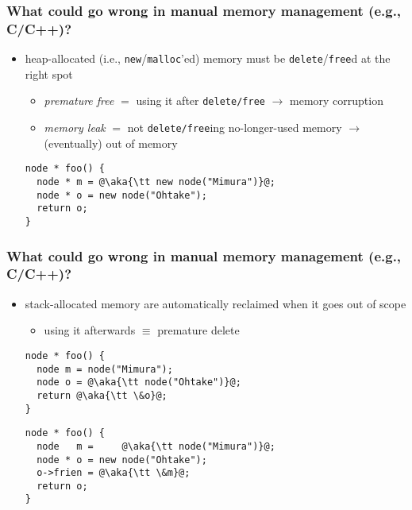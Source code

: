 \documentclass[12pt,dvipdfmx]{beamer}
\newif\ifja
\newif\ifeng
\newcommand{\ao}[1]{{\color{blue}#1}}
\newcommand{\aka}[1]{{\color{red}#1}}
\begin{document}
\ifja
\begin{frame}[fragile]
\frametitle{あ}
\begin{itemize}
\item あ
\end{itemize}
\begin{lstlisting}
あ
\end{lstlisting}
\end{frame}
\fi
\ifeng
\begin{frame}[fragile]
  \frametitle{What could go wrong in manual memory management (e.g., C/C++)?}
  \begin{itemize}
  \item heap-allocated (i.e., {\tt new}/{\tt malloc}'ed) memory
    must be {\tt delete}/{\tt free}d at the right spot
    \begin{itemize}
    \item
      \ao{\it premature free} $=$
      using it after {\tt delete/free} $\rightarrow$ memory corruption
      
    \item \ao{\it memory leak} $=$
      not {\tt delete/free}ing no-longer-used memory $\rightarrow$
      (eventually) out of memory
      
    \end{itemize}
\begin{lstlisting}
node * foo() {
  node * m = @\aka{\tt new node("Mimura")}@;
  node * o = new node("Ohtake");
  return o;
}    
\end{lstlisting}
\end{itemize}
\end{frame}


\begin{frame}[fragile]
  \frametitle{What could go wrong in manual memory management (e.g., C/C++)?}
  \begin{itemize}
  \item stack-allocated memory are automatically reclaimed when
    it goes out of scope
    \begin{itemize}
    \item using it afterwards $\equiv$ premature delete
    \end{itemize}
\begin{lstlisting}
node * foo() {
  node m = node("Mimura");
  node o = @\aka{\tt node("Ohtake")}@;
  return @\aka{\tt \&o}@;
}    
\end{lstlisting}
\begin{lstlisting}
node * foo() {
  node   m =     @\aka{\tt node("Mimura")}@;
  node * o = new node("Ohtake");
  o->frien = @\aka{\tt \&m}@;
  return o;
}    
\end{lstlisting}
  \end{itemize}
  

\end{frame}
\end{document}

